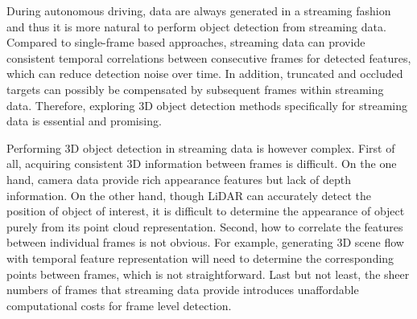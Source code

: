\documentclass{bmvc2k}
\begin{document}
During autonomous driving, data are always generated in a streaming fashion and thus it is more natural to perform object detection from streaming data. Compared to single-frame based approaches, streaming data can provide consistent temporal correlations between consecutive frames for detected features, which can reduce detection noise over time. In addition, truncated and occluded targets can possibly be compensated by subsequent frames within streaming data. Therefore, exploring 3D object detection methods specifically for streaming data is essential and promising.



Performing 3D object detection in streaming data is however complex. First of all, acquiring consistent 3D information between frames is difficult. On the one hand, camera data provide rich appearance features but lack of depth information. On the other hand, though LiDAR can accurately detect the position of object of interest, it is difficult to determine the appearance of object purely from its point cloud representation. Second, how to correlate the features between individual frames is not obvious. For example, generating 3D scene flow with temporal feature representation will need to determine the corresponding points between frames, which is not straightforward. Last but not least, the sheer numbers of frames that streaming data provide introduces unaffordable computational costs for frame level detection. 
\end{document}
